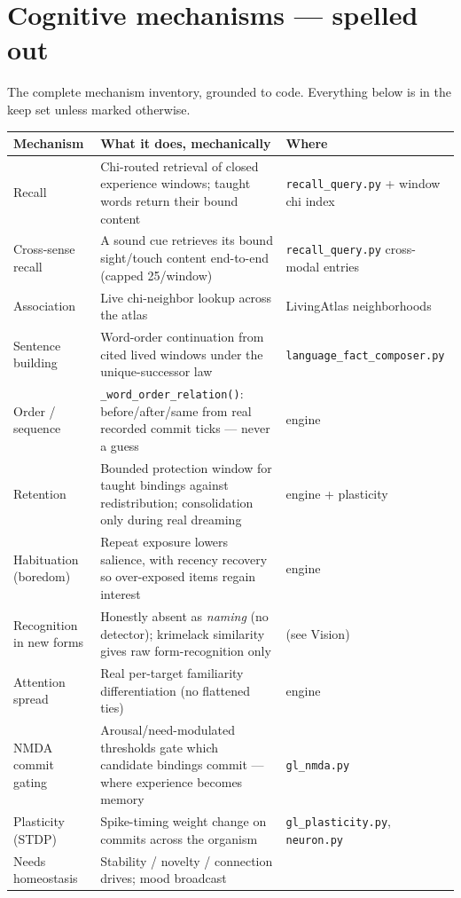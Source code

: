 \documentclass[11pt]{article}
\begin{document}
\section{Cognitive mechanisms — spelled out}\label{sec:mechanisms}

The complete mechanism inventory, grounded to code. Everything below is in
the keep set unless marked otherwise.

\begin{longtable}{p{} p{} p{}}
\toprule
\textbf{Mechanism} & \textbf{What it does, mechanically} & \textbf{Where} \\
\midrule
Recall & Chi-routed retrieval of closed experience windows; taught words
return their bound content & \texttt{recall\_query.py} + window chi index \\
Cross-sense recall & A sound cue retrieves its bound sight/touch content
end-to-end (capped 25/window) & \texttt{recall\_query.py} cross-modal
entries \\
Association & Live chi-neighbor lookup across the atlas &
LivingAtlas neighborhoods \\
Sentence building & Word-order continuation from cited lived windows under
the unique-successor law & \texttt{language\_fact\_composer.py} \\
Order / sequence & \texttt{\_word\_order\_relation()}: before/after/same
from real recorded commit ticks — never a guess & engine \\
Retention & Bounded protection window for taught bindings against
redistribution; consolidation only during real dreaming & engine +
plasticity \\
Habituation (boredom) & Repeat exposure lowers salience, with recency
recovery so over-exposed items regain interest & engine \\
Recognition in new forms & Honestly absent as \emph{naming} (no detector);
krimelack similarity gives raw form-recognition only & (see Vision) \\
Attention spread & Real per-target familiarity differentiation (no
flattened ties) & engine \\
NMDA commit gating & Arousal/need-modulated thresholds gate which candidate
bindings commit — where experience becomes memory & \texttt{gl\_nmda.py} \\
Plasticity (STDP) & Spike-timing weight change on commits across the
organism & \texttt{gl\_plasticity.py}, \texttt{neuron.py} \\
Needs homeostasis & Stability / novelty / connection drives; mood broadcast

\end{longtable}
\end{document}
